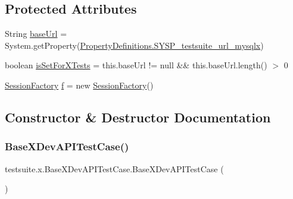 \subsection*{Protected Attributes}
\begin{DoxyCompactItemize}
\item 
String \mbox{\hyperlink{classtestsuite_1_1x_1_1_base_x_dev_a_p_i_test_case_a94e9be8bb82a4130d5a8fc48fb8645b1}{base\+Url}} = System.\+get\+Property(\mbox{\hyperlink{classcom_1_1mysql_1_1cj_1_1conf_1_1_property_definitions_a3952b559e0b2ffabf6b1c21eccd179e7}{Property\+Definitions.\+S\+Y\+S\+P\+\_\+testsuite\+\_\+url\+\_\+mysqlx}})
\item 
boolean \mbox{\hyperlink{classtestsuite_1_1x_1_1_base_x_dev_a_p_i_test_case_a23802eeb5cfd30dec1f476c94d909285}{is\+Set\+For\+X\+Tests}} = this.\+base\+Url != null \&\& this.\+base\+Url.\+length() $>$ 0
\item 
\mbox{\hyperlink{classcom_1_1mysql_1_1cj_1_1xdevapi_1_1_session_factory}{Session\+Factory}} \mbox{\hyperlink{classtestsuite_1_1x_1_1_base_x_dev_a_p_i_test_case_aa5304216e343498a6ae2d1d9a90016df}{f}} = new \mbox{\hyperlink{classcom_1_1mysql_1_1cj_1_1xdevapi_1_1_session_factory}{Session\+Factory}}()
\end{DoxyCompactItemize}


\subsection{Constructor \& Destructor Documentation}
\mbox{\label{classtestsuite_1_1x_1_1_base_x_dev_a_p_i_test_case_ad943b876db31d0e1bb386c89b2b135fa}} 
\subsubsection{\texorpdfstring{Base\+X\+Dev\+A\+P\+I\+Test\+Case()}{BaseXDevAPITestCase()}}
{\footnotesize\ttfamily testsuite.\+x.\+Base\+X\+Dev\+A\+P\+I\+Test\+Case.\+Base\+X\+Dev\+A\+P\+I\+Test\+Case (\begin{DoxyParamCaption}{ }\end{DoxyParamCaption})}



